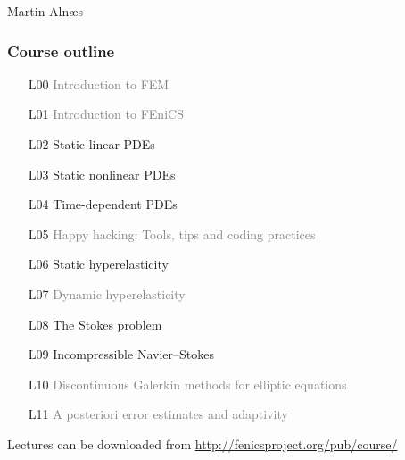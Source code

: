 \documentclass{fenicscourse}
\begin{document}
              {Martin Aln\ae{}s}

\begin{frame}
  \frametitle{Course outline}


  \small


%

  \begin{enumerate}
  \item[L00]
    \textcolor{grey}{Introduction to FEM}
  \item[L01]
    \textcolor{grey}{Introduction to FEniCS}
  \item[L02]
    Static linear PDEs
  \item[L03]
    Static nonlinear PDEs
  \item[L04]
    Time-dependent PDEs
  \item[L05]
    \textcolor{grey}{Happy hacking: Tools, tips and coding practices}
  \item[L06]
    Static hyperelasticity
  \item[L07]
    \textcolor{grey}{Dynamic hyperelasticity}
  \item[L08]
    The Stokes problem
  \item[L09]
    Incompressible Navier--Stokes
  \item[L10]
    \textcolor{grey}{Discontinuous Galerkin methods for elliptic equations}
  \item[L11]
    \textcolor{grey}{A posteriori error estimates and adaptivity}
  \end{enumerate}

  \normalsize

  {\footnotesize Lectures can be downloaded from
    \url{http://fenicsproject.org/pub/course/}}

\end{frame}








\end{document}
